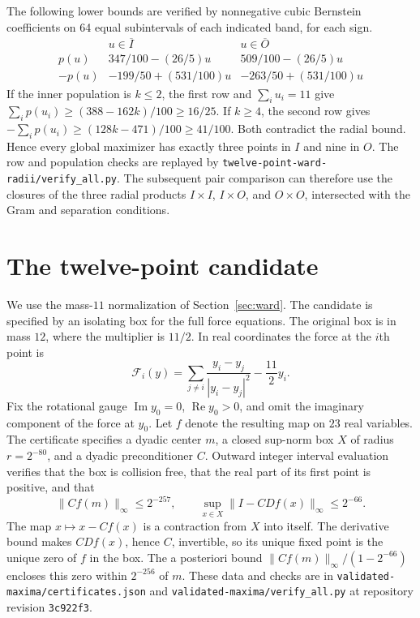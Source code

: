 \documentclass[11pt,letterpaper]{article}
\theoremstyle{remark}
\begin{document}
The following lower bounds are verified by nonnegative cubic Bernstein
coefficients on 64 equal subintervals of each indicated band, for each
sign.
\[
\begin{array}{c|cc}
 &u\in\overline I &u\in\overline O\\ \hline
 p(u) & 347/100-(26/5)u & 509/100-(26/5)u\\
 -p(u) & -199/50+(531/100)u & -263/50+(531/100)u
\end{array}
\]
If the inner population is \(k\le2\), the first row and \(\sum_i u_i=11\)
give \(\sum_i p(u_i)\ge(388-162k)/100\ge16/25\). If \(k\ge4\), the
second row gives \(-\sum_i p(u_i)\ge(128k-471)/100\ge41/100\).
Both contradict the radial bound. Hence every global maximizer has
exactly three points in \(I\) and nine in \(O\). The row and population
checks are replayed by \texttt{twelve-point-ward-radii/}\allowbreak\texttt{verify\_all.py}.
The subsequent pair comparison can therefore use the closures of the
three radial products \(I\times I\), \(I\times O\), and \(O\times O\),
intersected with the Gram and separation conditions.

\section{The twelve-point candidate}
\label{sec:candidate}

We use the mass-$11$ normalization of Section~\ref{sec:ward}. The candidate is specified by an isolating box for the full force equations. The original box is in mass $12$, where the multiplier is $11/2$. In real coordinates the force at the $i$th point is
\[
 \mathcal F_i(y)=\sum_{j\ne i}\frac{y_i-y_j}{|y_i-y_j|^2}
                   -\frac{11}{2}y_i.
\]
Fix the rotational gauge $\operatorname{Im}y_0=0$, $\operatorname{Re}y_0>0$, and omit the imaginary component of the force at $y_0$. Let $f$ denote the resulting map on $23$ real variables. The certificate specifies a dyadic center $m$, a closed sup-norm box $X$ of radius $r=2^{-80}$, and a dyadic preconditioner $C$. Outward integer interval evaluation verifies that the box is collision free, that the real part of its first point is positive, and that
\[
 \|Cf(m)\|_\infty\le 2^{-257},\qquad
 \sup_{x\in X}\|I-CDf(x)\|_\infty\le 2^{-66}.
\]
The map $x\mapsto x-Cf(x)$ is a contraction from $X$ into itself. The derivative bound makes $CDf(x)$, hence $C$, invertible, so its unique fixed point is the unique zero of $f$ in the box. The a posteriori bound $\|Cf(m)\|_\infty/(1-2^{-66})$ encloses this zero within $2^{-256}$ of $m$. These data and checks are in \texttt{validated-maxima/}\allowbreak\texttt{certificates.json} and \texttt{validated-maxima/}\allowbreak\texttt{verify\_all.py} at repository revision \texttt{3c922f3}.
\end{document}
